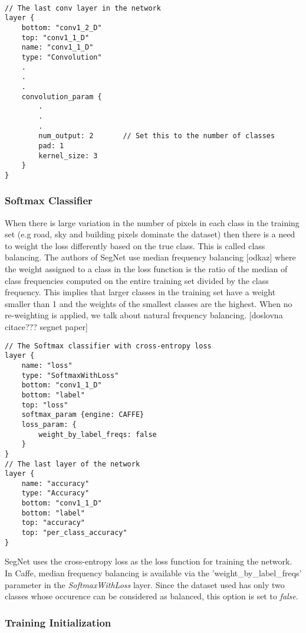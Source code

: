 \begin{lstlisting}

// The last conv layer in the network
layer {
	bottom: "conv1_2_D"
	top: "conv1_1_D"
	name: "conv1_1_D"
	type: "Convolution"
	.
	.
	.
	convolution_param {
		.
		.
		.
		num_output: 2		// Set this to the number of classes
		pad: 1
		kernel_size: 3
	}
}
\end{lstlisting}

\subsubsection{Softmax Classifier}

When there is large variation in the number of pixels in each class in the training set (e.g road, sky and building pixels dominate the dataset) then there is a need to weight the loss differently based on the true class. This is called class balancing. The authors of SegNet use median frequency balancing [odkaz] where the weight assigned to a class in the loss function is the ratio of the median of class frequencies computed on the entire training set divided by the class frequency. This implies that larger classes in the training set have a weight smaller than 1 and the weights of the smallest classes are the highest. When no re-weighting is applied, we talk about natural frequency balancing. [doslovna citace??? segnet paper]

\begin{lstlisting}
// The Softmax classifier with cross-entropy loss
layer {
	name: "loss"
	type: "SoftmaxWithLoss"
	bottom: "conv1_1_D"
	bottom: "label"
	top: "loss"
	softmax_param {engine: CAFFE}
	loss_param: {
		weight_by_label_freqs: false	     
	}
}
// The last layer of the network
layer {
	name: "accuracy"
	type: "Accuracy"
	bottom: "conv1_1_D"
	bottom: "label"
	top: "accuracy"
	top: "per_class_accuracy"
}
\end{lstlisting}


SegNet uses the cross-entropy loss as the loss function for training the network. In Caffe, median frequency balancing is available via the 'weight\_by\_label\_freqs' parameter in the \textit{SoftmaxWithLoss} layer. Since the dataset used has only two classes whose occurence can be considered as balanced, this option is set to \textit{false}. 

\subsubsection{Training Initialization}

